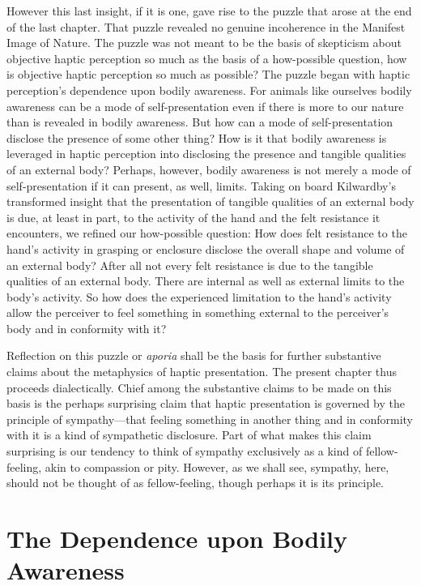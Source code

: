 However this last insight, if it is one, gave rise to the puzzle that arose at the end of the last chapter. That puzzle revealed no genuine incoherence in the Manifest Image of Nature. The puzzle was not meant to be the basis of skepticism about objective haptic perception so much as the basis of a how-possible question, how is objective haptic perception so much as possible? The puzzle began with haptic perception's dependence upon bodily awareness. For animals like ourselves bodily awareness can be a mode of self-presentation even if there is more to our nature than is revealed in bodily awareness. But how can a mode of self-presentation disclose the presence of some other thing? How is it that bodily awareness is leveraged in haptic perception into disclosing the presence and tangible qualities of an external body? Perhaps, however, bodily awareness is not merely a mode of self-presentation if it can present, as well, limits. Taking on board Kilwardby's transformed insight that the presentation of tangible qualities of an external body is due, at least in part, to the activity of the hand and the felt resistance it encounters, we refined our how-possible question: How does felt resistance to the hand's activity in grasping or enclosure disclose the overall shape and volume of an external body? After all not every felt resistance is due to the tangible qualities of an external body. There are internal as well as external limits to the body's activity. So how does the experienced limitation to the hand's activity allow the perceiver to feel something in something external to the perceiver's body and in conformity with it?

Reflection on this puzzle or \emph{aporia} shall be the basis for further substantive claims about the metaphysics of haptic presentation. The present chapter thus proceeds dialectically. Chief among the substantive claims to be made on this basis is the perhaps surprising claim that haptic presentation is governed by the principle of sympathy---that feeling something in another thing and in conformity with it is a kind of sympathetic disclosure. Part of what makes this claim surprising is our tendency to think of sympathy exclusively as a kind of fellow-feeling, akin to compassion or pity. However, as we shall see, sympathy, here, should not be thought of as fellow-feeling, though perhaps it is its principle.


\section{The Dependence upon Bodily Awareness} %
\label{sec:the_dependence_of_haptic_perception_upon_bodily_awareness}

